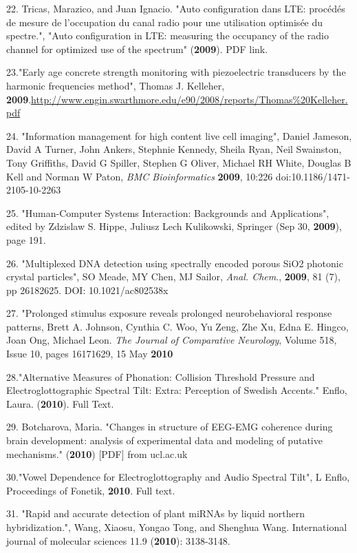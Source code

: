 22. Tricas, Marazico, and Juan Ignacio. "Auto configuration dans LTE: proc\'{e}d\'{e}s de mesure de l’occupation du canal radio pour une utilisation optimis\'{e}e du spectre.", "Auto configuration in LTE: measuring the occupancy of the radio channel for optimized use of the spectrum" (\textbf{2009}). PDF link.

23."Early age concrete strength monitoring with piezoelectric transducers by the harmonic frequencies method", Thomas J. Kelleher, \textbf{2009}.\url{http://www.engin.swarthmore.edu/e90/2008/reports/Thomas\%20Kelleher.pdf}

24. "Information management for high content live cell imaging", Daniel Jameson, David A Turner, John Ankers, Stephnie Kennedy, Sheila Ryan, Neil Swainston, Tony Griffiths, David G Spiller, Stephen G Oliver, Michael RH White, Douglas B Kell and Norman W Paton, \textit{BMC Bioinformatics} \textbf{2009}, 10:226 doi:10.1186/1471-2105-10-2263

25. "Human-Computer Systems Interaction: Backgrounds and Applications", edited by Zdzislaw S. Hippe, Juliusz Lech Kulikowski, Springer (Sep 30, \textbf{2009}), page 191.

26. "Multiplexed DNA detection using spectrally encoded porous SiO2 photonic crystal particles", SO Meade, MY Chen, MJ Sailor, \textit{Anal. Chem}., \textbf{2009}, 81 (7), pp 2618\textendash{}2625. DOI: 10.1021/ac802538x

27. "Prolonged stimulus exposure reveals prolonged neurobehavioral response patterns, Brett A. Johnson, Cynthia C. Woo, Yu Zeng, Zhe Xu, Edna E. Hingco, Joan Ong, Michael Leon. \textit{The Journal of Comparative Neurology}, Volume 518, Issue 10, pages 1617\textendash{}1629, 15 May \textbf{2010}

28."Alternative Measures of Phonation: Collision Threshold Pressure and Electroglottographic Spectral Tilt: Extra: Perception of Swedish Accents." Enflo, Laura. (\textbf{2010}). Full Text.

29. Botcharova, Maria. "Changes in structure of EEG-EMG coherence during brain development: analysis of experimental data and modeling of putative mechanisms." (\textbf{2010}) [PDF] from ucl.ac.uk

30."Vowel Dependence for Electroglottography and Audio Spectral Tilt", L Enflo, Proceedings of Fonetik, \textbf{2010}. Full text.

31. "Rapid and accurate detection of plant miRNAs by liquid northern hybridization.", Wang, Xiaosu, Yongao Tong, and Shenghua Wang. International journal of molecular sciences 11.9 (\textbf{2010}): 3138-3148.

